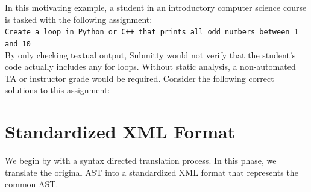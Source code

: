 \documentclass[thesis]{hmcposter}
\begin{document}
\begin{poster}
In this motivating example, a student in an introductory computer science course is tasked with the following assignment:
\\
\texttt{Create a loop in Python or C++ that prints all odd numbers between 1 and 10}
\\
By only checking textual output, Submitty would not verify that the student's code actually includes any for loops. Without static analysis, a non-automated TA or instructor grade would be required. Consider the following correct solutions to this assignment:

\begin{figure}
\begin{center}
\hspace{0.4in}
\end{center}
\end{figure}

\section{Standardized XML Format}

We begin by with a syntax directed translation process. In this phase, we translate the original AST into a standardized XML format that represents the common AST.
\vspace{0.5in}


\end{poster}
\end{document}
